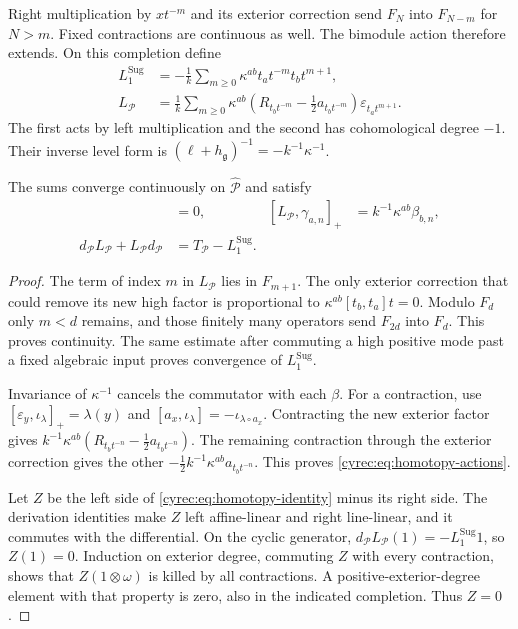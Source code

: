 Right multiplication by $xt^{-m}$ and its exterior correction
send $F_N$ into $F_{N-m}$ for $N>m$. Fixed contractions are
continuous as well. The bimodule action therefore extends.
On this completion define
\begin{align}
 L_1^{\mathrm{Sug}}
 &=-\frac1k\sum_{m\geq0}\kappa^{ab}
                          t_at^{-m}t_bt^{m+1},
 \label{cyrec:eq:sugawara}\\
 L_{\mathcal P}
 &=\frac1k\sum_{m\geq0}\kappa^{ab}
    \left(R_{t_bt^{-m}}-\tfrac12a_{t_bt^{-m}}\right)
                          \varepsilon_{t_at^{m+1}}.
 \label{cyrec:eq:translation-homotopy}
\end{align}
The first acts by left multiplication and the second has
cohomological degree $-1$. Their inverse level form is
$(\ell+h_{\mathfrak g})^{-1}=-k^{-1}\kappa^{-1}$.

\begin{proposition}\label{cyrec:prop:translation-homotopy}
The sums converge continuously on $\widehat{\mathcal P}$ and
satisfy
\begin{align}
 [L_{\mathcal P},\beta_{a,n}]&=0,
 & [L_{\mathcal P},\gamma_{a,n}]_+
      &=k^{-1}\kappa^{ab}\beta_{b,n},
 \label{cyrec:eq:homotopy-actions}\\
 d_{\mathcal P}L_{\mathcal P}+L_{\mathcal P}d_{\mathcal P}
      &=T_{\mathcal P}-L_1^{\mathrm{Sug}}.
 \label{cyrec:eq:homotopy-identity}
\end{align}
\end{proposition}

\begin{proof}
The term of index $m$ in $L_{\mathcal P}$ lies in $F_{m+1}$.
The only exterior correction that could remove its new high
factor is proportional to $\kappa^{ab}[t_b,t_a]t=0$.
Modulo $F_d$ only $m<d$ remains, and those finitely many
operators send $F_{2d}$ into $F_d$. This proves continuity.
The same estimate after commuting a high positive mode past a
fixed algebraic input proves convergence of
$L_1^{\mathrm{Sug}}$.

Invariance of $\kappa^{-1}$ cancels the commutator with each
$\beta$. For a contraction, use
$[\varepsilon_y,\iota_\lambda]_+=\lambda(y)$ and
$[a_x,\iota_\lambda]=-\iota_{\lambda\circ a_x}$.
Contracting the new exterior factor gives
$k^{-1}\kappa^{ab}(R_{t_bt^{-n}}-\tfrac12a_{t_bt^{-n}})$.
The remaining contraction through the exterior correction gives
the other $-\tfrac12k^{-1}\kappa^{ab}a_{t_bt^{-n}}$.
This proves \eqref{cyrec:eq:homotopy-actions}.

Let $Z$ be the left side of \eqref{cyrec:eq:homotopy-identity}
minus its right side. The derivation identities make $Z$
left affine-linear and right line-linear, and it commutes with
the differential. On the cyclic generator,
$d_{\mathcal P}L_{\mathcal P}(1)=-L_1^{\mathrm{Sug}}1$,
so $Z(1)=0$. Induction on exterior degree, commuting $Z$ with
every contraction, shows that $Z(1\otimes\omega)$ is killed by
all contractions. A positive-exterior-degree element with that
property is zero, also in the indicated completion. Thus $Z=0$.
\end{proof}

